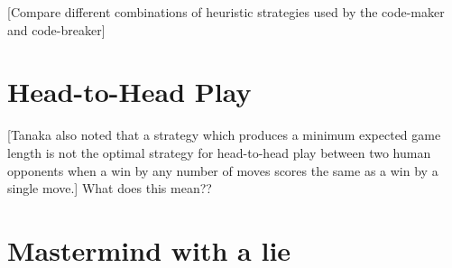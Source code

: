 [Compare different combinations of heuristic strategies used by the code-maker and code-breaker]

\section{Head-to-Head Play}

[Tanaka also noted that a strategy which produces a minimum expected
game length is not the optimal strategy for head-to-head play between two human
opponents when a win by any number of moves scores the same as a win by a
single move.] What does this mean??

\section{Mastermind with a lie}

